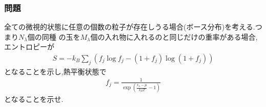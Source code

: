 \documentclass[uplatex,a4j,11pt,dvipdfmx]{jsarticle}
\begin{document}
\title{}
\author{61908697 佐々木良輔}
\date{}
\maketitle
\subsubsection*{問題}
全ての微視的状態に任意の個数の粒子が存在しうる場合(ボース分布)を考える.つまり$N_\lambda$個の同種
の玉を$M_\lambda$個の入れ物に入れるのと同じだけの重率がある場合,エントロピーが
\begin{align}
  S=-k_B\sum_j\left(f_j\log f_j-(1+f_j)\log(1+f_j)\right)
\end{align}
となることを示し,熱平衡状態で
\begin{align}
  f_j=\frac{1}{\exp\left(\frac{\epsilon_\lambda-\mu}{k_BT}-1\right)}
\end{align}
となることを示せ.\\
\hrulefill
\end{document}
